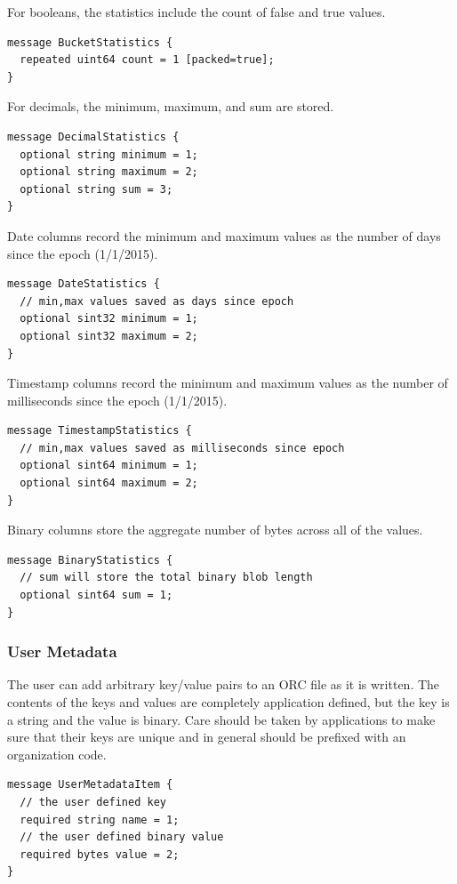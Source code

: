 \documentclass{article}
\begin{document}
For booleans, the statistics include the count of false and true values.

\begin{verbatim}
message BucketStatistics {
  repeated uint64 count = 1 [packed=true];
}
\end{verbatim}

For decimals, the minimum, maximum, and sum are stored.

\begin{verbatim}
message DecimalStatistics {
  optional string minimum = 1;
  optional string maximum = 2;
  optional string sum = 3;
}
\end{verbatim}

Date columns record the minimum and maximum values as the number of days since
the epoch (1/1/2015).

\begin{verbatim}
message DateStatistics {
  // min,max values saved as days since epoch
  optional sint32 minimum = 1;
  optional sint32 maximum = 2;
}
\end{verbatim}

Timestamp columns record the minimum and maximum values as the number of 
milliseconds since the epoch (1/1/2015).

\begin{verbatim}
message TimestampStatistics {
  // min,max values saved as milliseconds since epoch
  optional sint64 minimum = 1;
  optional sint64 maximum = 2;
}
\end{verbatim}

Binary columns store the aggregate number of bytes across all of the values.

\begin{verbatim}
message BinaryStatistics {
  // sum will store the total binary blob length
  optional sint64 sum = 1;
}
\end{verbatim}

\subsubsection{User Metadata}

The user can add arbitrary key/value pairs to an ORC file as it is
written. The contents of the keys and values are completely
application defined, but the key is a string and the value is
binary. Care should be taken by applications to make sure that their
keys are unique and in general should be prefixed with an organization
code.

\begin{verbatim}
message UserMetadataItem {
  // the user defined key
  required string name = 1;
  // the user defined binary value
  required bytes value = 2;
}
\end{verbatim}
\end{document}
